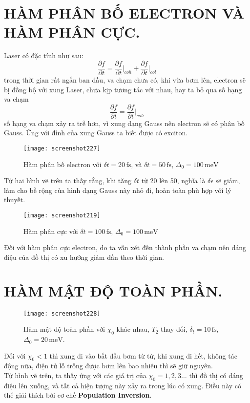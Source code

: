 \documentclass[16Pt]{article}
\begin{document}
	\section*{HÀM PHÂN BỐ ELECTRON VÀ HÀM PHÂN CỰC.}
	Laser có đặc tính như sau:
	\[
	\frac{\partial f}{\partial t} = \frac{\partial f}{\partial t} \Bigg|_{coh} +\frac{\partial f}{\partial t} \Bigg|_{col} 
	\]
	trong thời gian rất ngắn ban đầu, va chạm chưa có, khi vừa bơm lên, electron sẽ bị đồng bộ với xung Laser, chưa kịp tương tác với nhau, hay ta bỏ qua số hạng va chạm 
	\[
	\frac{\partial f}{\partial t} = \frac{\partial f}{\partial t} \Bigg|_{coh}
	\]
	số hạng va chạm xảy ra trễ hơn, vì xung dạng Gauss nên electron sẽ có phân bố Gauss. Ứng với đỉnh của xung Gauss ta biết được có exciton.
	\newpage
	\begin{figure}[h!]
		\centering
		\texttt{[image: screenshot227]}
		\caption{Hàm phân bố electron với $\delta t = 20 \, \text{fs}$, và $\delta t = 50 \, \text{fs}$, $\Delta_0 = 100 \, \text{meV}$}
		\label{fig:screenshot227}
	\end{figure}
	Từ hai hình vẽ trên ta thấy rằng, khi tăng $\delta t$ từ 20 lên 50, nghĩa là $\delta \epsilon$ sẽ giảm, làm cho bề rộng của hình dạng Gauss này nhỏ đi, hoàn toàn phù hợp với lý thuyết.\\
	\begin{figure}[h!]
		\centering
		\texttt{[image: screenshot219]}
		\caption{Hàm phân cực với $\delta t = 100 \, \text{fs}$, $\Delta_0 = 100 \, \text{meV}$}
		\label{fig:screenshot219}
	\end{figure}
	\indent Đối với hàm phân cực electron, do ta vẫn xét đến thành phần va chạm nên dáng điệu của đồ thị có xu hướng giảm dần theo thời gian.
	\newpage
	\section*{HÀM MẬT ĐỘ TOÀN PHẦN.}
\begin{figure}[h!]
	\centering
	\texttt{[image: screenshot228]}
	\caption{Hàm mật độ toàn phần với $\chi_0$ khác nhau, $T_2$ thay đổi, $\delta_t = 10 \, \text{fs}$, $\Delta_0 = 20 \, \text{meV}$.}
	\label{fig:screenshot228}
\end{figure}
	Đối với $\chi_0 < 1$ thì xung đi vào bắt đầu bơm từ từ, khi xung đi hết, không tác động nữa, điện tử lỗ trống được bơm lên bao nhiêu thì sẽ giữ nguyên.\\
	Từ hình vẽ trên, ta thấy ứng với các giá trị của $\chi_0 = 1,2,3\ldots$ thì đồ thị có dáng điệu lên xuống, và tất cả hiện tượng này xảy ra trong lúc có xung. Điều này có thể giải thích bởi cơ chế \textbf{Population Inversion}.
	
\end{document}
